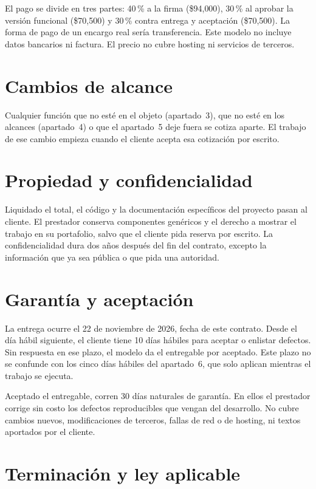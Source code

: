 El pago se divide en tres partes: 40\,\% a la firma (\$94{,}000), 30\,\% al
aprobar la versión funcional (\$70{,}500) y 30\,\% contra entrega y aceptación
(\$70{,}500). La forma de pago de un encargo real sería transferencia. Este
modelo no incluye datos bancarios ni factura. El precio no cubre hosting ni
servicios de terceros.

\section{Cambios de alcance}

Cualquier función que no esté en el objeto (apartado~3), que no esté en los
alcances (apartado~4) o que el apartado~5 deje fuera se cotiza aparte. El
trabajo de ese cambio empieza cuando el cliente acepta esa cotización por
escrito.

\section{Propiedad y confidencialidad}

Liquidado el total, el código y la documentación específicos del proyecto pasan
al cliente. El prestador conserva componentes genéricos y el derecho a mostrar
el trabajo en su portafolio, salvo que el cliente pida reserva por escrito.
La confidencialidad dura dos años después del fin del contrato, excepto la
información que ya sea pública o que pida una autoridad.

\section{Garantía y aceptación}

La entrega ocurre el 22 de noviembre de 2026, fecha de este contrato. Desde el
día hábil siguiente, el cliente tiene 10 días hábiles para aceptar o enlistar
defectos. Sin respuesta en ese plazo, el modelo da el entregable por aceptado.
Este plazo no se confunde con los cinco días hábiles del apartado~6, que solo
aplican mientras el trabajo se ejecuta.

Aceptado el entregable, corren 30 días naturales de garantía. En ellos el
prestador corrige sin costo los defectos reproducibles que vengan del
desarrollo. No cubre cambios nuevos, modificaciones de terceros, fallas de red
o de hosting, ni textos aportados por el cliente.

\section{Terminación y ley aplicable}

